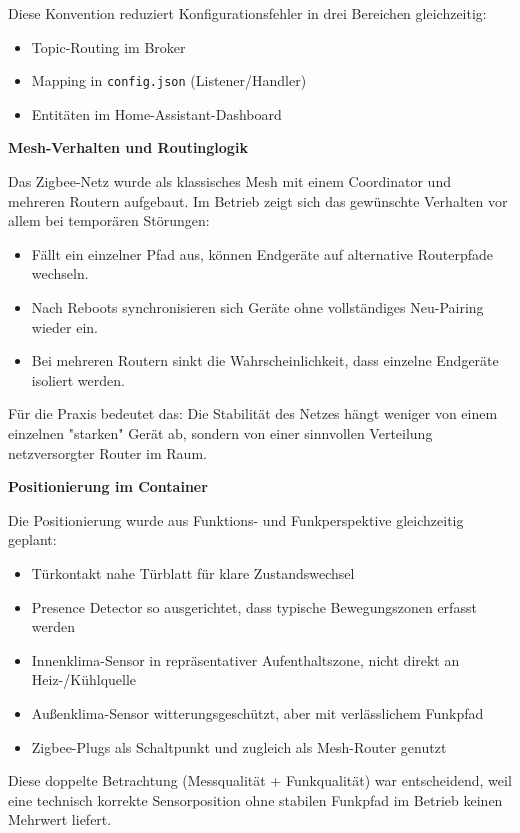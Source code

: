 Diese Konvention reduziert Konfigurationsfehler in drei Bereichen gleichzeitig:

\begin{itemize}
    \item Topic-Routing im Broker
    \item Mapping in \texttt{config.json} (Listener/Handler)
    \item Entitäten im Home-Assistant-Dashboard
\end{itemize}

\textbf{Mesh-Verhalten und Routinglogik}

Das Zigbee-Netz wurde als klassisches Mesh mit einem Coordinator und mehreren Routern aufgebaut. Im Betrieb zeigt sich das gewünschte Verhalten vor allem bei temporären Störungen:

\begin{itemize}
    \item Fällt ein einzelner Pfad aus, können Endgeräte auf alternative Routerpfade wechseln.
    \item Nach Reboots synchronisieren sich Geräte ohne vollständiges Neu-Pairing wieder ein.
    \item Bei mehreren Routern sinkt die Wahrscheinlichkeit, dass einzelne Endgeräte isoliert werden.
\end{itemize}

Für die Praxis bedeutet das: Die Stabilität des Netzes hängt weniger von einem einzelnen "starken" Gerät ab, sondern von einer sinnvollen Verteilung netzversorgter Router im Raum.

\textbf{Positionierung im Container}

Die Positionierung wurde aus Funktions- und Funkperspektive gleichzeitig geplant:

\begin{itemize}
    \item Türkontakt nahe Türblatt für klare Zustandswechsel
    \item Presence Detector so ausgerichtet, dass typische Bewegungszonen erfasst werden
    \item Innenklima-Sensor in repräsentativer Aufenthaltszone, nicht direkt an Heiz-/Kühlquelle
    \item Außenklima-Sensor witterungsgeschützt, aber mit verlässlichem Funkpfad
    \item Zigbee-Plugs als Schaltpunkt und zugleich als Mesh-Router genutzt
\end{itemize}

Diese doppelte Betrachtung (Messqualität + Funkqualität) war entscheidend, weil eine technisch korrekte Sensorposition ohne stabilen Funkpfad im Betrieb keinen Mehrwert liefert.


